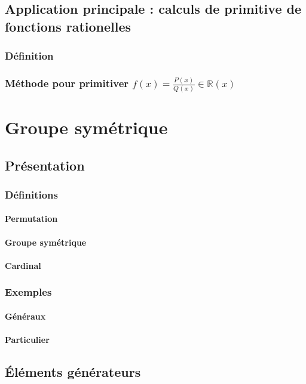 \documentclass[12pt,a4paper,french]{book}
\begin{document}
	\section{Application principale : calculs de primitive de fonctions rationelles}
		\subsection{Définition}
		\subsection{Méthode pour primitiver $f(x)=\frac{P(x)}{Q(x)} \in \mathbb{R}(x)$}
		
\chapter{Groupe symétrique}
	\section{Présentation}
		\subsection{Définitions}
			\subsubsection{Permutation}
			\subsubsection{Groupe symétrique}
			\subsubsection{Cardinal}
		\subsection{Exemples}
			\subsubsection{Généraux}
			\subsubsection{Particulier}
	\section{Éléments générateurs}
\end{document}
